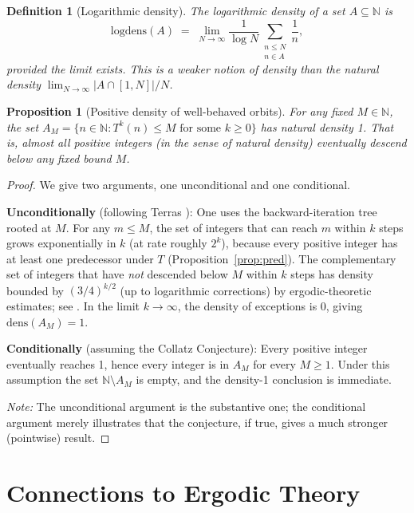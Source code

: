 \documentclass[12pt,a4paper]{article}
\newtheorem{proposition}[theorem]{Proposition}
\newtheorem{definition}[theorem]{Definition}
\begin{document}
\begin{definition}[Logarithmic density]\label{def:logdens}
The \emph{logarithmic density} of a set $A \subseteq \mathbb{N}$ is
\[
  \mathrm{logdens}(A) \;=\; \lim_{N \to \infty} \frac{1}{\log N} \sum_{\substack{n \leq N \\ n \in A}} \frac{1}{n},
\]
provided the limit exists. This is a weaker notion of density than the natural density
$\lim_{N\to\infty} |A \cap [1,N]|/N$.
\end{definition}

\begin{proposition}[Positive density of well-behaved orbits]\label{prop:pos_density}
For any fixed $M \in \mathbb{N}$, the set
$A_M = \{n \in \mathbb{N} : T^k(n) \leq M \text{ for some } k \geq 0\}$
has natural density 1. That is, almost all positive integers (in the sense of natural density)
eventually descend below any fixed bound $M$.
\end{proposition}

\begin{proof}
We give two arguments, one unconditional and one conditional.

\textbf{Unconditionally} (following Terras \cite{Terras1976}):
One uses the backward-iteration tree rooted at $M$. For any $m \leq M$, the set of integers
that can reach $m$ within $k$ steps grows exponentially in $k$ (at rate roughly $2^k$),
because every positive integer has at least one predecessor under $T$ (Proposition~\ref{prop:pred}).
The complementary set of integers that have \emph{not} descended below $M$ within $k$ steps
has density bounded by $(3/4)^{k/2}$ (up to logarithmic corrections) by
ergodic-theoretic estimates; see \cite{Terras1976}.
In the limit $k \to \infty$, the density of exceptions is 0, giving $\mathrm{dens}(A_M) = 1$.

\textbf{Conditionally} (assuming the Collatz Conjecture):
Every positive integer eventually reaches 1, hence every integer is in $A_M$ for every
$M \geq 1$. Under this assumption the set $\mathbb{N} \setminus A_M$ is empty, and the
density-1 conclusion is immediate.

\emph{Note:} The unconditional argument is the substantive one; the conditional argument
merely illustrates that the conjecture, if true, gives a much stronger (pointwise) result.
\end{proof}

\section{Connections to Ergodic Theory}
\end{document}
